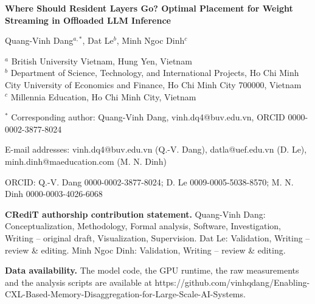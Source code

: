 \documentclass[11pt]{article}
\begin{document}
\textbf{\large Where Should Resident Layers Go? Optimal Placement for Weight Streaming in Offloaded LLM Inference}

\bigskip
Quang-Vinh Dang$^{a,*}$, Dat Le$^{b}$, Minh Ngoc Dinh$^{c}$

$^{a}$ British University Vietnam, Hung Yen, Vietnam\\
$^{b}$ Department of Science, Technology, and International Projects, Ho Chi Minh City University of Economics and Finance, Ho Chi Minh City 700000, Vietnam\\
$^{c}$ Millennia Education, Ho Chi Minh City, Vietnam

$^{*}$ Corresponding author: Quang-Vinh Dang, vinh.dq4@buv.edu.vn, ORCID 0000-0002-3877-8024

E-mail addresses: vinh.dq4@buv.edu.vn (Q.-V. Dang), datla@uef.edu.vn (D. Le), minh.dinh@maeducation.com (M. N. Dinh)

ORCID: Q.-V. Dang 0000-0002-3877-8024; D. Le 0009-0005-5038-8570; M. N. Dinh 0000-0003-4026-6068

\textbf{CRediT authorship contribution statement.} Quang-Vinh Dang: Conceptualization, Methodology, Formal analysis, Software, Investigation, Writing -- original draft, Visualization, Supervision. Dat Le: Validation, Writing -- review \& editing. Minh Ngoc Dinh: Validation, Writing -- review \& editing.

\textbf{Data availability.} The model code, the GPU runtime, the raw measurements and the analysis scripts are available at https://github.com/vinhqdang/Enabling-CXL-Based-Memory-Disaggregation-for-Large-Scale-AI-Systems.
\end{document}
